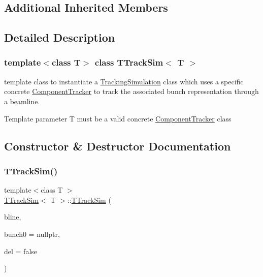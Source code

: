 \subsection*{Additional Inherited Members}


\subsection{Detailed Description}
\subsubsection*{template$<$class T$>$\newline
class T\+Track\+Sim$<$ T $>$}

template class to instantiate a \hyperlink{classTrackingSimulation}{Tracking\+Simulation} class which uses a specific concrete \hyperlink{classComponentTracker}{Component\+Tracker} to track the associated bunch representation through a beamline.

Template parameter T must be a valid concrete \hyperlink{classComponentTracker}{Component\+Tracker} class 

\subsection{Constructor \& Destructor Documentation}
\mbox{\label{classTTrackSim_a753039bec4d3e2ae3cc452daf65681f7}} 
\subsubsection{\texorpdfstring{T\+Track\+Sim()}{TTrackSim()}\hspace{0.1cm}{\footnotesize\ttfamily [1/5]}}
{\footnotesize\ttfamily template$<$class T $>$ \\
\hyperlink{classTTrackSim}{T\+Track\+Sim}$<$ T $>$\+::\hyperlink{classTTrackSim}{T\+Track\+Sim} (\begin{DoxyParamCaption}\item[{const \hyperlink{classAcceleratorModel_1_1Beamline}{Accelerator\+Model\+::\+Beamline} \&}]{bline,  }\item[{bunch\+\_\+type $\ast$}]{bunch0 = {\ttfamily nullptr},  }\item[{bool}]{del = {\ttfamily false} }\end{DoxyParamCaption})\hspace{0.3cm}{\ttfamily [explicit]}}

